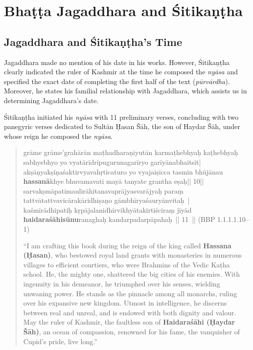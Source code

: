 \chapter{Bhaṭṭa Jagaddhara and Śitikaṇṭha}


\section{Jagaddhara and Śitikaṇṭha's Time}

Jagaddhara made no mention of his date in his works. However, Śitikaṇṭha clearly indicated the ruler of Kashmir at the time he composed the \emph{nyāsa} and specified the exact date of completing the first half of the text (\emph{pūrvārdha}). Moreover, he states his familial relationship with Jagaddhara, which assists us in determining Jagaddhara's date.

Śitikaṇṭha initiated his \emph{nyāsa} with 11 preliminary verses, concluding with two panegyric verses dedicated to Sultān Ḥasan Šāh, the son of Haydar Šāh, under whose reign he composed the \emph{nyāsa}.

\begin{quote}	
	\textsanskrit{grāme grāme'grahārān maṭhadharaṇiyutān karmaṭhebhyaḥ kaṭhebhyaḥ 
	sabhyebhyo yo vyatārīdripugurunagarīryo garīyānabhaitsīt|\\
	akṣāṇyakṣīṇaśaktirvyavahṛticaturo yo vyajaiṣīcca tasmin
	bhūjānau \textbf{hassanā}khye bhuvamavati mayā tanyate grantha eṣaḥ|| 10||\\
	sarvakṣmāpatimaulirāhitanavaprājyasvarājyaḥ paraṃ
	tattvātattvavicārakāridhiṣaṇo gāmbhīryaśauryānvitaḥ |\\	
	kaśmīrādhipatiḥ kṛpājalanidhirvikhyātakīrtiściraṃ
	jīyād \textbf{haidaraśāhisūnu}ranaghaḥ kandarpadarpāpahaḥ || 11 ||}
	(BBP 1.1.1.1.10--1)
	

	“I am crafting this book during the reign of the king called \textbf{Hassana (Ḥasan)}, who bestowed royal land grants with monasteries in numerous villages to efficient courtiers, who were Brahmins of the Vedic Kaṭha school. He, the mighty one, shattered the big cities of his enemies. With ingenuity in his demeanor, he triumphed over his senses, wielding unwaning power. He stands as the pinnacle among all monarchs, ruling over his expansive new kingdom. Utmost in intelligence, he discerns between real and unreal, and is endowed with both dignity and valour. May the ruler of Kashmir, the faultless son of \textbf{Haidaraśāhi (Ḥaydar Šāh)}, an ocean of compassion, renowned for his fame, the vanquisher of Cupid's pride, live long.”	
\end{quote}

